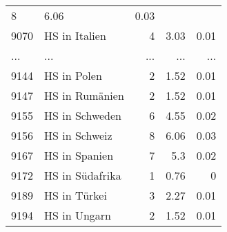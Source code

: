 \begin{longtable}{lXrrr}
          \num{8} &
          \num[round-mode=places,round-precision=2]{6,06} &
          \num[round-mode=places,round-precision=2]{0,03} \\
        9070 & \multicolumn{1}{X}{HS in Italien} & %
          \num{4} &
          \num[round-mode=places,round-precision=2]{3,03} &
          \num[round-mode=places,round-precision=2]{0,01} \\
       ... & ... & ... & ... & ... \\
        9144 & \multicolumn{1}{X}{HS in Polen} & %
          \num{2} &
          \num[round-mode=places,round-precision=2]{1,52} &
          \num[round-mode=places,round-precision=2]{0,01} \\

        9147 & \multicolumn{1}{X}{HS in Rumänien} & %
          \num{2} &
          \num[round-mode=places,round-precision=2]{1,52} &
          \num[round-mode=places,round-precision=2]{0,01} \\

        9155 & \multicolumn{1}{X}{HS in Schweden} & %
          \num{6} &
          \num[round-mode=places,round-precision=2]{4,55} &
          \num[round-mode=places,round-precision=2]{0,02} \\

        9156 & \multicolumn{1}{X}{HS in Schweiz} & %
          \num{8} &
          \num[round-mode=places,round-precision=2]{6,06} &
          \num[round-mode=places,round-precision=2]{0,03} \\

        9167 & \multicolumn{1}{X}{HS in Spanien} & %
          \num{7} &
          \num[round-mode=places,round-precision=2]{5,3} &
          \num[round-mode=places,round-precision=2]{0,02} \\

        9172 & \multicolumn{1}{X}{HS in Südafrika} & %
          \num{1} &
          \num[round-mode=places,round-precision=2]{0,76} &
          \num[round-mode=places,round-precision=2]{0} \\

        9189 & \multicolumn{1}{X}{HS in Türkei} & %
          \num{3} &
          \num[round-mode=places,round-precision=2]{2,27} &
          \num[round-mode=places,round-precision=2]{0,01} \\

        9194 & \multicolumn{1}{X}{HS in Ungarn} & %
          \num{2} &
          \num[round-mode=places,round-precision=2]{1,52} &
          \num[round-mode=places,round-precision=2]{0,01} \\


\end{longtable}

